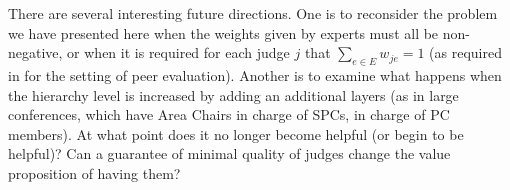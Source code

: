 \documentclass[letterpaper]{article} %
\newtheorem{example}{Example}
\newcommand{\judge}{\ensuremath{j} }
\newcommand{\experts}{\ensuremath{E} }
\newcommand{\expert}{\ensuremath{e} }
\newcommand{\nick}[1]{\todo[color=kentuckyblue!40,size=footnotesize]{Nick says: #1}}
\begin{document}
There are several interesting future directions. One is to reconsider the problem we have presented here when the weights given by experts must all be non-negative, or when it is required for each judge $\judge$ that $\sum_{\expert \in \experts} w_{\judge \expert} = 1$ (as required in \citet{ALMRW16,ALMRW19} for the setting of peer evaluation). Another is to examine what happens when the hierarchy level is increased by adding an additional layers (as in large conferences, which have Area Chairs in charge of SPCs, in charge of PC members). At what point does it no longer become helpful (or begin to be helpful)? Can a guarantee of minimal quality of judges change the value proposition of having them?%





\clearpage




\end{document}
